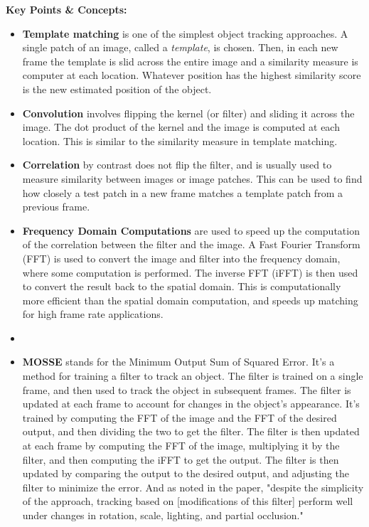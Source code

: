 \documentclass{article}
\begin{document}
\textbf{Key Points \& Concepts:}
\begin{itemize}
  \item \textbf{Template matching} is one of the simplest object tracking approaches. A single patch of an image, called a \emph{template}, is chosen. Then, in each new frame the template is slid across the entire image and a similarity measure is computer at each location. Whatever position has the highest similarity score is the new estimated position of the object. 
  \item \textbf{Convolution} involves flipping the kernel (or filter) and sliding it across the image. The dot product of the kernel and the image is computed at each location. This is similar to the similarity measure in template matching.
  \item \textbf{Correlation} by contrast does not flip the filter, and is usually used to measure similarity between images or image patches. This can be used to find how closely a test patch in a new frame matches a template patch from a previous frame.
  \item \textbf{Frequency Domain Computations} are used to speed up the computation of the correlation between the filter and the image. A Fast Fourier Transform (FFT) is used to convert the image and filter into the frequency domain, where some computation is performed. The inverse FFT (iFFT) is then used to convert the result back to the spatial domain. This is computationally more efficient than the spatial domain computation, and speeds up matching for high frame rate applications.
  \item \item \textbf{MOSSE} stands for the Minimum Output Sum of Squared Error. It's a method for training a filter to track an object. The filter is trained on a single frame, and then used to track the object in subsequent frames. The filter is updated at each frame to account for changes in the object's appearance. It's trained by computing the FFT of the image and the FFT of the desired output, and then dividing the two to get the filter. The filter is then updated at each frame by computing the FFT of the image, multiplying it by the filter, and then computing the iFFT to get the output. The filter is then updated by comparing the output to the desired output, and adjusting the filter to minimize the error. And as noted in the paper, "despite the simplicity of the approach, tracking based on [modifications of this filter] perform well under changes in rotation, scale, lighting, and partial occlusion."
\end{itemize}
\end{document}
